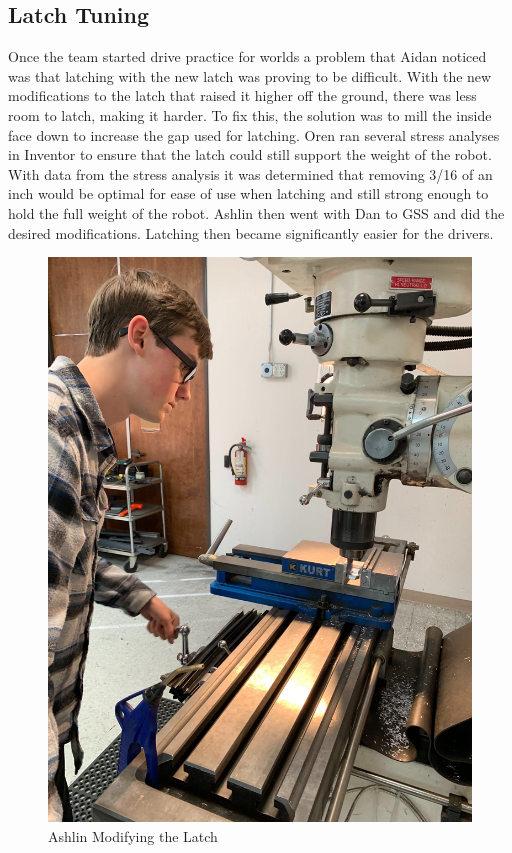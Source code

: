 \documentclass{article}
\begin{document}
\subsection{Latch Tuning}
Once the team started drive practice for worlds a problem that Aidan noticed was that latching with the new latch was proving to be difficult. With the new modifications to the latch that raised it higher off the ground, there was less room to latch, making it harder. To fix this, the solution was to mill the inside face down to increase the gap used for latching. Oren ran several stress analyses in Inventor to ensure that the latch could still support the weight of the robot. With data from the stress analysis it was determined that removing 3/16 of an inch would be optimal for ease of use when latching and still strong enough to hold the full weight of the robot. Ashlin then went with Dan to GSS and did the desired modifications. Latching then became significantly easier for the drivers. 

\begin{figure}
    \centering
    \includegraphics[width= 0.5 \textwidth]{32_04-08/images/ashlinmachining.jpg}
    \caption{Ashlin Modifying the Latch}
    \label{fig:latch}
\end{figure}
\end{document}
